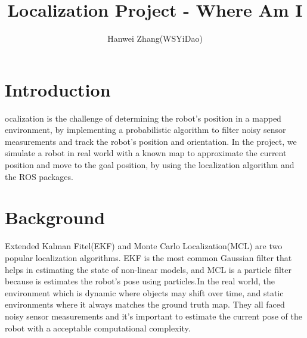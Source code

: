 \documentclass[10pt,journal,compsoc]{IEEEtran}
\begin{document}
\title{Localization Project - Where Am I}

\author{Hanwei Zhang(WSYiDao)}

%
{}


\maketitle
\IEEEdisplaynontitleabstractindextext
\IEEEpeerreviewmaketitle
\section{Introduction}
\label{sec:introduction}

ocalization is the challenge of determining the robot's position in a mapped environment, by implementing a probabilistic algorithm to filter noisy sensor measurements and track the robot's position and orientation. In the project, we simulate a robot in real world with a known map to approximate the current position and move to the goal position, by using the localization algorithm and the ROS packages.



\section{Background}
Extended Kalman Fitel(EKF) and Monte Carlo Localization(MCL) are two popular localization algorithms. EKF is the most common Gaussian filter that helps in estimating the state of non-linear models, and MCL is a particle filter because is estimates the robot's pose using particles.In the real world, the environment which is dynamic where objects may shift over time,  and static environments where it always matches the ground truth map. They all faced noisy sensor measurements and it's important to estimate the current pose of the robot with a acceptable computational complexity.
\end{document}
